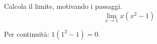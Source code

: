 
\begin{esercizio}
Calcola il limite, motivando i passaggi.
\[
        \lim_{x\to 1} x(x^2-1)
    \]
\end{esercizio}

\begin{soluzione}
Per continuità: $1(1^2-1)=0$.
\end{soluzione}
